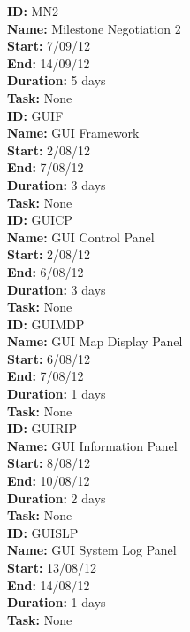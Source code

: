 \documentclass[11pt, a4paper]{report}
\begin{document}
\noindent \textbf{ID:} MN2 \\
\noindent \textbf{Name:} Milestone Negotiation 2 \\
\noindent \textbf{Start:} 7/09/12 \\
\noindent \textbf{End:} 14/09/12 \\
\noindent \textbf{Duration:} 5 days \\
\noindent \textbf{Task:} None\\[0.5cm]

\noindent \textbf{ID:} GUIF \\
\noindent \textbf{Name:} GUI Framework \\
\noindent \textbf{Start:} 2/08/12 \\
\noindent \textbf{End:} 7/08/12 \\
\noindent \textbf{Duration:} 3 days \\
\noindent \textbf{Task:} None\\[0.5cm]

\noindent \textbf{ID:} GUICP \\
\noindent \textbf{Name:} GUI Control Panel \\
\noindent \textbf{Start:} 2/08/12 \\
\noindent \textbf{End:} 6/08/12 \\
\noindent \textbf{Duration:} 3 days \\
\noindent \textbf{Task:} None\\[0.5cm]

\noindent \textbf{ID:} GUIMDP \\
\noindent \textbf{Name:} GUI Map Display Panel \\
\noindent \textbf{Start:} 6/08/12 \\
\noindent \textbf{End:} 7/08/12 \\
\noindent \textbf{Duration:} 1 days \\
\noindent \textbf{Task:} None\\[0.5cm]

\noindent \textbf{ID:} GUIRIP \\
\noindent \textbf{Name:} GUI Information Panel \\
\noindent \textbf{Start:} 8/08/12 \\
\noindent \textbf{End:} 10/08/12 \\
\noindent \textbf{Duration:} 2 days \\
\noindent \textbf{Task:} None\\[0.5cm]

\noindent \textbf{ID:} GUISLP \\
\noindent \textbf{Name:} GUI System Log Panel \\
\noindent \textbf{Start:} 13/08/12 \\
\noindent \textbf{End:} 14/08/12 \\
\noindent \textbf{Duration:} 1 days \\
\noindent \textbf{Task:} None\\[0.5cm]
\end{document}
